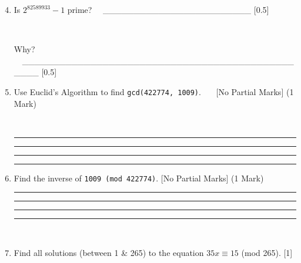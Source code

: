 \documentclass[12pt,emtex]{article}
\begin{document}
    \vspace{2mm}
    \begin{enumerate}
    
        \setcounter{enumi}{3}
        
\item Is $2^{82589933}-1$ prime?   \ \ \_\_\_\_\_\_\_\_\_\_\_\_\_\_\_\_\_\_\_\_\_\_\_\_	\hfill [0.5]

\

Why? \ \ \_\_\_\_\_\_\_\_\_\_\_\_\_\_\_\_\_\_\_\_\_\_\_\_\_\_\_\_\_\_\_\_\_\_\_\_\_\_\_\_\_\_\_\_\_\_\_\_ \hfill [0.5]

\item Use Euclid's Algorithm to find \texttt{gcd(422774, 1009)}.
\ \ \ 
       [No Partial Marks] \hfill  (1 Mark)


\

  \vspace{10mm}

    \hrule

    \vspace{10mm}

    \hrule

    \vspace{10mm}

    \hrule

    \vspace{10mm}

    \hrule

    \vspace{10mm}

  


    \item Find the inverse of \texttt{1009 (mod 422774)}. [No Partial Marks] \hfill     (1 Mark)



  
    \vspace{10mm}

    \hrule

    \vspace{10mm}

    \hrule

    \vspace{10mm}

    \hrule

    \vspace{10mm}

    \hrule


\

	 \item  Find all solutions (between 1 \& 265) to the equation $35x \equiv 15$ (mod 265).         \hfill     [1]


\end{enumerate}
\end{document}
